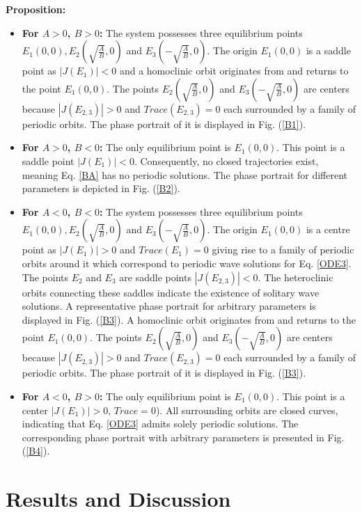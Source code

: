 \documentclass[10pt]{NSP1}
\numberwithin{equation}{section}
\begin{document}
\textbf{Proposition:}
\begin{itemize}
  \item \textbf{For $A > 0$, $B > 0$:} The system possesses three equilibrium points $E_{1}(0, 0), E_{2}(\sqrt{\frac{A}{B}},0)$ and $E_{3}(-\sqrt{\frac{A}{B}}, 0)$. The origin $E_{1}(0, 0)$ is a saddle point as $|J(E_{1})| < 0$ and a homoclinic orbit originates from and returns to the point $E_{1}(0, 0)$. The points $E_{2}(\sqrt{\frac{A}{B}},0)$ and $E_{3}(-\sqrt{\frac{A}{B}}, 0)$ are centers because $|J(E_{2,3})| > 0$ and $Trace(E_{2,3})=0$ each surrounded by a family of periodic orbits. The phase portrait of it is displayed in Fig. (\ref{B1}).
  \item \textbf{For $A > 0$, $B < 0$:} The only equilibrium point is $E_{1}(0, 0)$. This point is a saddle point $|J(E_{1})| < 0$. Consequently, no closed trajectories exist, meaning Eq. \ref{BA} has no periodic solutions. The phase portrait for different parameters is depicted in Fig. (\ref{B2}).
  \item \textbf{For $A < 0$, $B < 0$:} The system possesses three equilibrium points $E_{1}(0, 0), E_{2}(\sqrt{\frac{A}{B}},0)$ and $E_{3}(-\sqrt{\frac{A}{B}}, 0)$. The origin $E_{1}(0, 0)$ is a centre point as $|J(E_{1})| > 0$ and $Trace(E_{1})=0$ giving rise to a family of periodic orbits around it which correspond to periodic wave solutions for Eq. \ref{ODE3}. The points $E_{2}$ and $E_{3}$ are saddle points $|J(E_{2,3})| < 0$. The heteroclinic orbits connecting these saddles indicate the existence of solitary wave solutions. A representative phase portrait for arbitrary parameters is displayed in Fig. (\ref{B3}). A homoclinic orbit originates from and returns to the point $E_{1}(0, 0)$. The points $E_{2}(\sqrt{\frac{A}{B}},0)$ and $E_{3}(-\sqrt{\frac{A}{B}}, 0)$ are centers because $|J(E_{2,3})| > 0$ and $Trace(E_{2,3})=0$ each surrounded by a family of periodic orbits. The phase portrait of it is displayed in Fig. (\ref{B3}).
  \item \textbf{For $A < 0$, $B > 0$:} The only equilibrium point is $E_{1}(0, 0)$. This point is a center $|J(E_{1})| > 0$, $Trace=0$). All surrounding orbits are closed curves, indicating that Eq. \ref{ODE3} admits solely periodic solutions. The corresponding phase portrait with arbitrary parameters is presented in Fig. (\ref{B4}).
\end{itemize}

\section{Results and Discussion}\label{s4}
\end{document}
